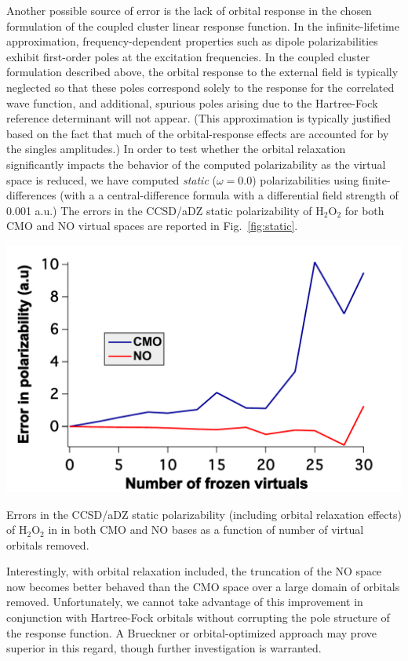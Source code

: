 Another possible source of error is the lack of orbital response in the chosen
formulation of the coupled cluster linear response function.\cite{Koch94:BCC}
In the infinite-lifetime approximation, frequency-dependent properties such as
dipole polarizabilities exhibit first-order poles at the excitation
frequencies.  In the coupled cluster formulation described above, the orbital
response to the external field is typically neglected so that these poles
correspond solely to the response for the correlated wave function, and
additional, spurious poles arising due to the Hartree-Fock reference
determinant will not appear.  (This approximation is typically justified based
on the fact that much of the orbital-response effects are accounted for by the
singles amplitudes.\cite{Christiansen95:CC2})  In order to test whether the
orbital relaxation significantly impacts the behavior of the computed
polarizability as the virtual space is reduced, we have computed {\em static}
($\omega = 0.0$) polarizabilities using finite-differences (with a a
central-difference formula with a differential field strength of 0.001 a.u.)
The errors in the CCSD/aDZ static polarizability of H$_2$O$_2$ for both CMO
and NO virtual spaces are reported in Fig.~\ref{fig:static}.  
\begin{MyFigure}[h!]
\centering
\includegraphics[width=0.6\linewidth,natwidth=610,natheight=642]{figures_fvno/polar_static.pdf}
\caption{{\footnotesize Errors in the CCSD/aDZ static polarizability
(including orbital relaxation effects) of H$_2$O$_2$ in
in both CMO and NO bases as a function of number of virtual orbitals
removed.}}
\label{fig:static}
\end{MyFigure}
Interestingly, with orbital relaxation included, the truncation of the NO space now becomes
better behaved than the CMO space over a large domain of orbitals removed.
Unfortunately, we cannot take advantage of this improvement in conjunction
with Hartree-Fock orbitals without corrupting the pole structure of the
response function.  A Brueckner or orbital-optimized approach may prove
superior in this regard, though further investigation is
warranted.\cite{Koch94:BCC,Pedersen01}

